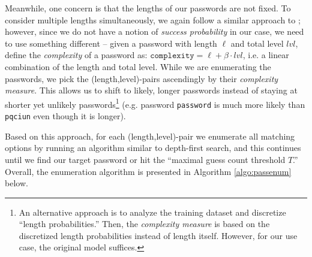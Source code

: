 \documentclass{article} %
\theoremstyle{definition}
\theoremstyle{theorem}
\theoremstyle{remark}
\theoremstyle{remark}
\begin{document}
\par\quad Meanwhile, one concern is that the lengths of our passwords are not fixed. To consider multiple lengths simultaneously, we again follow a similar approach to \cite{omen}; however, since we do not have a notion of \emph{success probability} in our case, we need to use something different -- given a password with length $\ell$ and total level $lvl$, define the \emph{complexity} of a password as: $\texttt{complexity} = \ell + \beta\cdot lvl$, i.e. a linear combination of the length and total level. While we are enumerating the passwords, we pick the (length,level)-pairs ascendingly by their \emph{complexity measure}. This allows us to shift to likely, longer passwords instead of staying at shorter yet unlikely passwords\footnote{An alternative approach is to analyze the training dataset and discretize ``length probabilities.'' Then, the \emph{complexity measure} is based on the discretized length probabilities instead of length itself. However, for our use case, the original model suffices.} (e.g. password \texttt{password} is much more likely than \texttt{pqciun} even though it is longer).
\par\quad Based on this approach, for each (length,level)-pair we enumerate all matching options by running an algorithm similar to depth-first search, and this continues until we find our target password or hit the ``maximal guess count threshold $T$.'' Overall, the enumeration algorithm is presented in Algorithm \ref{algo:passenum} below.
\end{document}
